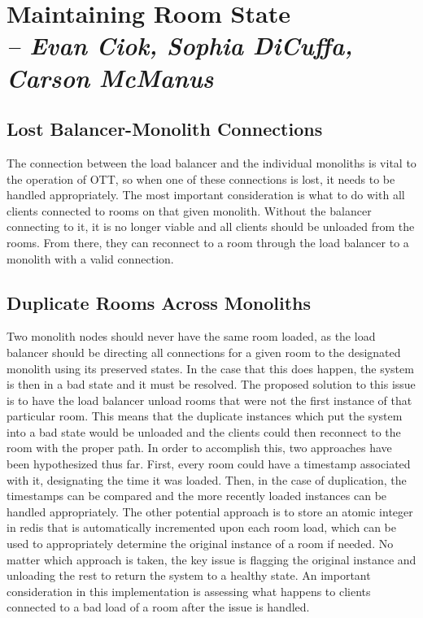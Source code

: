 \chapter{Maintaining Room State \\
  \small{\textit{-- Evan Ciok, Sophia DiCuffa, Carson McManus}}
  \label{Chapter::RoomState}}

\section{Lost Balancer-Monolith Connections}

The connection between the load balancer and the individual monoliths is vital to the operation of OTT, so when one of these connections is lost, it needs to be handled appropriately. 
The most important consideration is what to do with all clients connected to rooms on that given monolith. Without the balancer connecting to it, it is no longer viable and all clients 
should be unloaded from the rooms. From there, they can reconnect to a room through the load balancer to a monolith with a valid connection. 

\section{Duplicate Rooms Across Monoliths}

Two monolith nodes should never have the same room loaded, as the load balancer should be directing all connections for a given room to the designated monolith using its preserved states. 
In the case that this does happen, the system is then in a bad state and it must be resolved. The proposed solution to this issue is to have the load balancer unload rooms that were not the 
first instance of that particular room. This means that the duplicate instances which put the system into a bad state would be unloaded and the clients could then reconnect to the room with 
the proper path. In order to accomplish this, two approaches have been hypothesized thus far. First, every room could have a timestamp associated with it, designating the time it was loaded. 
Then, in the case of duplication, the timestamps can be compared and the more recently loaded instances can be handled appropriately. The other potential approach is to store an atomic integer 
in redis that is automatically incremented upon each room load, which can be used to appropriately determine the original instance of a room if needed. No matter which approach is taken, 
the key issue is flagging the original instance and unloading the rest to return the system to a healthy state. An important consideration in this implementation is assessing what happens to 
clients connected to a bad load of a room after the issue is handled. 
